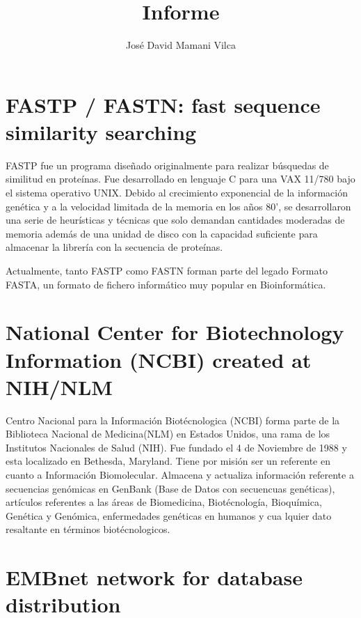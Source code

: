 \documentclass[12pt,conference]{IEEEtran}
\begin{document}
\title{Informe}

\author{José David Mamani Vilca}%

\onecolumn

\maketitle

\section{FASTP / FASTN: fast sequence similarity searching}

FASTP fue un programa diseñado originalmente para realizar búsquedas de similitud en proteínas. Fue desarrollado en lenguaje C para una VAX 11/780 bajo el sistema operativo UNIX. Debido al crecimiento exponencial de la información genética y a la velocidad limitada de la memoria en los años 80', se desarrollaron una serie de heurísticas y técnicas que solo demandan cantidades moderadas de memoria además de una unidad de disco con la capacidad suficiente para almacenar la librería con la secuencia de proteínas.

Actualmente, tanto FASTP como FASTN forman parte del legado Formato FASTA, un formato de fichero informático muy popular en Bioinformática. \citep{lipman1985rapid}

\medskip

\section{National Center for Biotechnology Information (NCBI) created at NIH/NLM }


Centro Nacional para la Información Biotécnologica (NCBI) forma parte de la Biblioteca Nacional de Medicina(NLM) en Estados Unidos, una rama de los Institutos Nacionales de Salud (NIH). Fue fundado el 4 de Noviembre de 1988 y esta localizado en Bethesda, Maryland. Tiene por misión ser un referente en cuanto a Información Biomolecular. Almacena y actualiza información referente a secuencias genómicas en GenBank (Base de Datos con secuencuas genéticas), artículos referentes a las áreas  de Biomedicina, Biotécnología, Bioquímica, Genética y Genómica, enfermedades genéticas en humanos y cua	lquier dato resaltante en términos biotécnologicos.

\medskip

\section{EMBnet network for database distribution}
\end{document}
